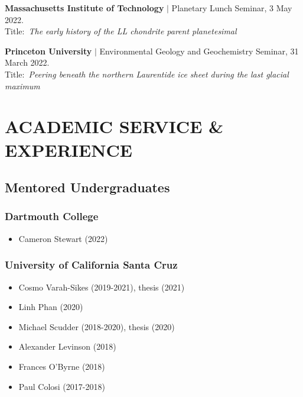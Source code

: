 \documentclass[10pt]{article}
\begin{document}
\begin{etaremune} [itemsep=4pt, leftmargin=3ex]

   \item \textbf{Massachusetts Institute of Technology} $|$
   Planetary Lunch Seminar, 3 May 2022. \\
  Title:~\textit{The early history of the LL chondrite parent planetesimal}

  \item \textbf{Princeton University} $|$ 
  Environmental Geology and Geochemistry Seminar, 31 March 2022. \\
  Title:~\textit{Peering beneath the northern Laurentide ice sheet during the last glacial maximum}
  
\end{etaremune}
\vspace{-12pt}

\section*{ACADEMIC SERVICE \& EXPERIENCE}

\subsection*{\textbf{Mentored Undergraduates}}
\subsubsection*{Dartmouth College}
\begin{itemize}
	\item Cameron Stewart (2022)
\end{itemize}

\subsubsection*{University of California Santa Cruz}
\begin{itemize}
	\item Cosmo Varah-Sikes (2019-2021), thesis (2021)
	\item Linh Phan (2020)
	\item Michael Scudder (2018-2020), thesis (2020)
	\item Alexander Levinson (2018)
	\item Frances O'Byrne (2018)
	\item Paul Colosi (2017-2018)
\end{itemize}
\end{document}

